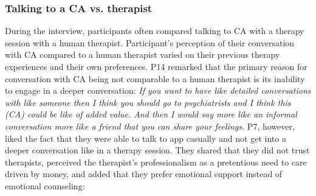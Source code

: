     \subsubsection{ Talking to a \ac{CA} vs. therapist}    
        During the interview, participants often compared talking to \ac{CA} with a therapy session with a human therapist.   
        Participant's perception of their conversation with \ac{CA} compared to a human therapist varied on their previous therapy experiences and their own preferences.
        P14 remarked that the primary reason for conversation with \ac{CA} being not comparable to a human therapist is its inability to engage in a deeper conversation:
                \textit{
                If you want to have like detailed conversations with like someone then I think you should go to psychiatrists and I think this (\ac{CA}) could be like of added value. And then I would say more like an informal conversation more like a friend that you can share your feelings.
                }
        P7, however, liked the fact that they were able to talk to \acl{app} casually and not get into a deeper conversation like in a therapy session. 
        They shared that they did not trust therapists, perceived the therapist's professionalism as a pretentious need to care driven by money, and added that they prefer emotional support instead of emotional counseling:
